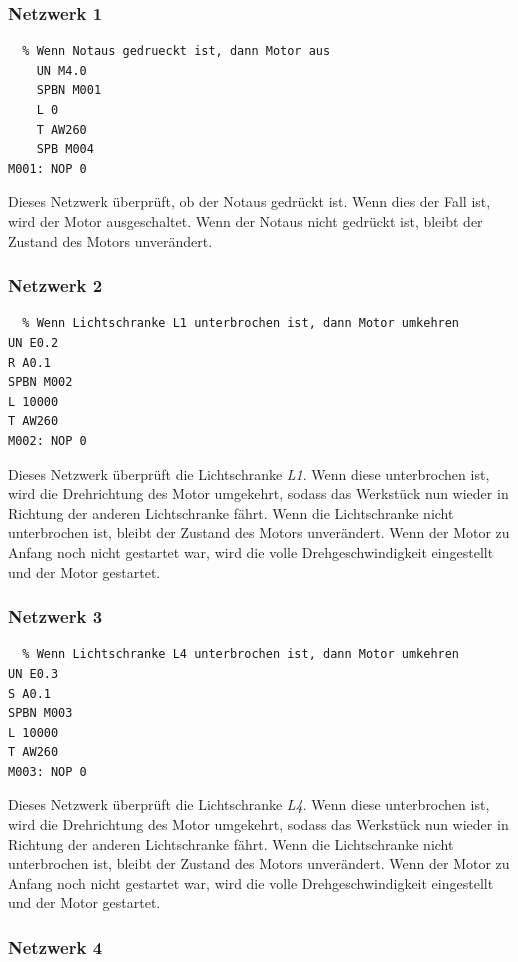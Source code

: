 \documentclass{report}
\begin{document}
\subsubsection{Netzwerk 1}

\begin{lstlisting}
  % Wenn Notaus gedrueckt ist, dann Motor aus
    UN M4.0 
    SPBN M001 
    L 0
    T AW260
    SPB M004 
M001: NOP 0
\end{lstlisting}
Dieses Netzwerk überprüft, ob der Notaus gedrückt ist. Wenn dies der Fall ist, wird der Motor ausgeschaltet. Wenn der Notaus nicht gedrückt ist, bleibt der Zustand des Motors unverändert.

\subsubsection{Netzwerk 2}

\begin{lstlisting}
  % Wenn Lichtschranke L1 unterbrochen ist, dann Motor umkehren
UN E0.2 
R A0.1
SPBN M002 
L 10000 
T AW260
M002: NOP 0
\end{lstlisting}
Dieses Netzwerk überprüft die Lichtschranke \textit{L1}. Wenn diese unterbrochen ist, wird die Drehrichtung des Motor umgekehrt, sodass das Werkstück nun wieder in Richtung der anderen Lichtschranke fährt. Wenn die Lichtschranke nicht unterbrochen ist, bleibt der Zustand des Motors unverändert. Wenn der Motor zu Anfang noch nicht gestartet war, wird die volle Drehgeschwindigkeit eingestellt und der Motor gestartet.

\subsubsection{Netzwerk 3}

\begin{lstlisting}
  % Wenn Lichtschranke L4 unterbrochen ist, dann Motor umkehren
UN E0.3
S A0.1
SPBN M003
L 10000
T AW260
M003: NOP 0
\end{lstlisting}

Dieses Netzwerk überprüft die Lichtschranke \textit{L4}. Wenn diese unterbrochen ist, wird die Drehrichtung des Motor umgekehrt, sodass das Werkstück nun wieder in Richtung der anderen Lichtschranke fährt. Wenn die Lichtschranke nicht unterbrochen ist, bleibt der Zustand des Motors unverändert. Wenn der Motor zu Anfang noch nicht gestartet war, wird die volle Drehgeschwindigkeit eingestellt und der Motor gestartet.
\subsubsection{Netzwerk 4}
\end{document}
